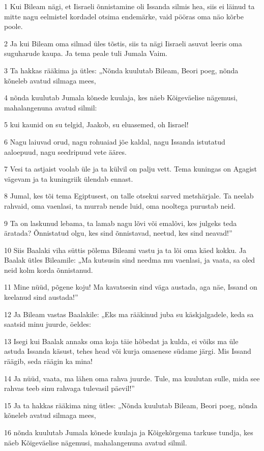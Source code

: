 \par 1 Kui Bileam nägi, et Iisraeli õnnistamine oli Issanda silmis hea, siis ei läinud ta mitte nagu eelmistel kordadel otsima endemärke, vaid pööras oma näo kõrbe poole.
\par 2 Ja kui Bileam oma silmad üles tõstis, siis ta nägi Iisraeli asuvat leeris oma suguharude kaupa. Ja tema peale tuli Jumala Vaim.
\par 3 Ta hakkas rääkima ja ütles: „Nõnda kuulutab Bileam, Beori poeg, nõnda kõneleb avatud silmaga mees,
\par 4 nõnda kuulutab Jumala kõnede kuulaja, kes näeb Kõigeväelise nägemusi, mahalangenuna avatud silmil:
\par 5 kui kaunid on su telgid, Jaakob, su eluasemed, oh Iisrael!
\par 6 Nagu laiuvad orud, nagu rohuaiad jõe kaldal, nagu Issanda istutatud aaloepuud, nagu seedripuud vete ääres.
\par 7 Vesi ta astjaist voolab üle ja ta külvil on palju vett. Tema kuningas on Agagist vägevam ja ta kuningriik ülendab ennast.
\par 8 Jumal, kes tõi tema Egiptusest, on talle otsekui sarved metshärjale. Ta neelab rahvaid, oma vaenlasi, ta murrab nende luid, oma nooltega purustab neid.
\par 9 Ta on laskunud lebama, ta lamab nagu lõvi või emalõvi, kes julgeks teda äratada? Õnnistatud olgu, kes sind õnnistavad, neetud, kes sind neavad!”
\par 10 Siis Baalaki viha süttis põlema Bileami vastu ja ta lõi oma käed kokku. Ja Baalak ütles Bileamile: „Ma kutsusin sind needma mu vaenlasi, ja vaata, sa oled neid kolm korda õnnistanud.
\par 11 Mine nüüd, põgene koju! Ma kavatsesin sind väga austada, aga näe, Issand on keelanud sind austada!”
\par 12 Ja Bileam vastas Baalakile: „Eks ma rääkinud juba su käskjalgadele, keda sa saatsid minu juurde, öeldes:
\par 13 Isegi kui Baalak annaks oma koja täie hõbedat ja kulda, ei võiks ma üle astuda Issanda käsust, tehes head või kurja omaenese südame järgi. Mis Issand räägib, seda räägin ka mina!
\par 14 Ja nüüd, vaata, ma lähen oma rahva juurde. Tule, ma kuulutan sulle, mida see rahvas teeb sinu rahvaga tulevasil päevil!”
\par 15 Ja ta hakkas rääkima ning ütles: „Nõnda kuulutab Bileam, Beori poeg, nõnda kõneleb avatud silmaga mees,
\par 16 nõnda kuulutab Jumala kõnede kuulaja ja Kõigekõrgema tarkuse tundja, kes näeb Kõigeväelise nägemusi, mahalangenuna avatud silmil.
